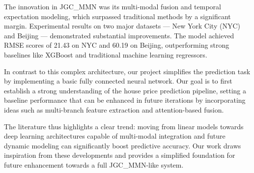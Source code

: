 The innovation in JGC\_MMN was its multi-modal fusion and temporal expectation modeling, which surpassed traditional methods by a significant margin. Experimental results on two major datasets — New York City (NYC) and Beijing — demonstrated substantial improvements. The model achieved RMSE scores of 21.43 on NYC and 60.19 on Beijing, outperforming strong baselines like XGBoost and traditional machine learning regressors.

In contrast to this complex architecture, our project simplifies the prediction task by implementing a basic fully connected neural network. Our goal is to first establish a strong understanding of the house price prediction pipeline, setting a baseline performance that can be enhanced in future iterations by incorporating ideas such as multi-branch feature extraction and attention-based fusion.

The literature thus highlights a clear trend: moving from linear models towards deep learning architectures capable of multi-modal integration and future dynamic modeling can significantly boost predictive accuracy. Our work draws inspiration from these developments and provides a simplified foundation for future enhancement towards a full JGC\_MMN-like system.
